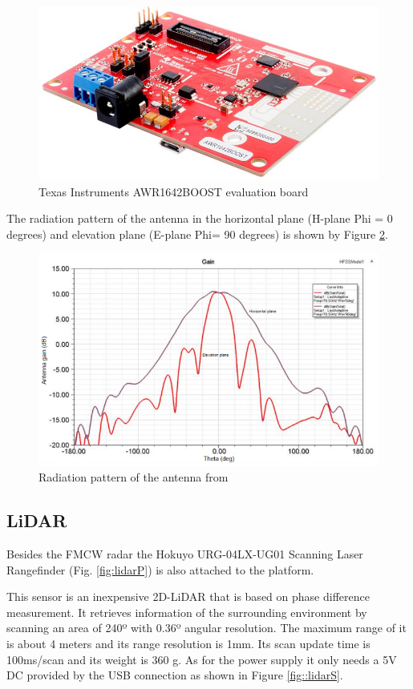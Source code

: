 \begin{figure}[ht!] 
\centerline{\includegraphics [width=0.5 \textwidth]{imgs/chapter4/awr1642.jpg}}
\caption{Texas Instruments AWR1642BOOST evaluation board}
\label{fig:awr}
\end{figure}


The radiation pattern of the antenna in the horizontal plane (H-plane Phi = 0 degrees) and elevation plane (E-plane Phi= 90 degrees) is shown by Figure \ref{fig:el}.
\begin{figure}[ht!] 
\centerline{\includegraphics [width=0.9 \textwidth]{imgs/chapter4/elevation.png}}
\caption[Radiation pattern of the antenna]{Radiation pattern of the antenna from \cite{el}}
\label{fig:el}
\end{figure}

\subsection{LiDAR}
Besides the \ac{FMCW} \ac{radar} the Hokuyo URG-04LX-UG01 Scanning Laser Rangefinder (Fig. \ref{fig:lidarP}) is also attached to the platform.

This sensor is an inexpensive 2D-\ac{LiDAR} that is based on phase difference measurement. It retrieves information of the surrounding environment by scanning an area of 240º with 0.36º angular resolution. The maximum range of it is about 4 meters and its range resolution is 1mm. Its scan update time is 100ms/scan and its weight is 360 g.  As for the power supply it only needs a 5V DC provided by the USB connection as shown in Figure \ref{fig::lidarS}.



